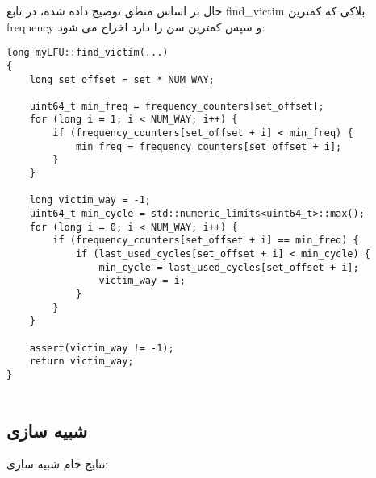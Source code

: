 \documentclass[17pt]{article}
\begin{document}
حال بر اساس منطق توضیح داده شده، در تابع find\_victim بلاکی که کمترین frequency و سپس کمترین سن را دارد اخراج می شود:
\begin{LTR}
\begin{lstlisting}
long myLFU::find_victim(...)
{
    long set_offset = set * NUM_WAY;

    uint64_t min_freq = frequency_counters[set_offset];
    for (long i = 1; i < NUM_WAY; i++) {
        if (frequency_counters[set_offset + i] < min_freq) {
            min_freq = frequency_counters[set_offset + i];
        }
    }

    long victim_way = -1;
    uint64_t min_cycle = std::numeric_limits<uint64_t>::max();
    for (long i = 0; i < NUM_WAY; i++) {
        if (frequency_counters[set_offset + i] == min_freq) {
            if (last_used_cycles[set_offset + i] < min_cycle) {
                min_cycle = last_used_cycles[set_offset + i];
                victim_way = i;
            }
        }
    }

    assert(victim_way != -1);
    return victim_way;
}


\end{lstlisting}
\end{LTR}


\subsection{شبیه سازی}
نتایج خام شبیه سازی:
\end{document}
